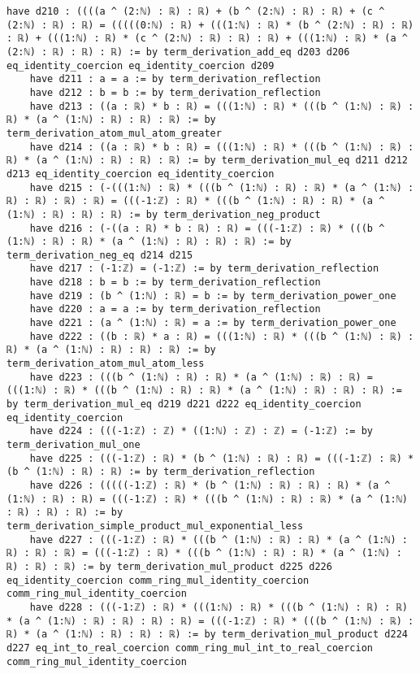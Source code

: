 \documentclass{article}
\begin{document}
\begin{tcolorbox}[colback=white!10, width=\linewidth]
\begin{lstlisting}[language=Lean4]
    have d210 : ((((a ^ (2:ℕ) : ℝ) : ℝ) + (b ^ (2:ℕ) : ℝ) : ℝ) + (c ^ (2:ℕ) : ℝ) : ℝ) = (((((0:ℕ) : ℝ) + (((1:ℕ) : ℝ) * (b ^ (2:ℕ) : ℝ) : ℝ) : ℝ) + (((1:ℕ) : ℝ) * (c ^ (2:ℕ) : ℝ) : ℝ) : ℝ) + (((1:ℕ) : ℝ) * (a ^ (2:ℕ) : ℝ) : ℝ) : ℝ) := by term_derivation_add_eq d203 d206 eq_identity_coercion eq_identity_coercion d209
    have d211 : a = a := by term_derivation_reflection
    have d212 : b = b := by term_derivation_reflection
    have d213 : ((a : ℝ) * b : ℝ) = (((1:ℕ) : ℝ) * (((b ^ (1:ℕ) : ℝ) : ℝ) * (a ^ (1:ℕ) : ℝ) : ℝ) : ℝ) := by term_derivation_atom_mul_atom_greater
    have d214 : ((a : ℝ) * b : ℝ) = (((1:ℕ) : ℝ) * (((b ^ (1:ℕ) : ℝ) : ℝ) * (a ^ (1:ℕ) : ℝ) : ℝ) : ℝ) := by term_derivation_mul_eq d211 d212 d213 eq_identity_coercion eq_identity_coercion
    have d215 : (-(((1:ℕ) : ℝ) * (((b ^ (1:ℕ) : ℝ) : ℝ) * (a ^ (1:ℕ) : ℝ) : ℝ) : ℝ) : ℝ) = (((-1:ℤ) : ℝ) * (((b ^ (1:ℕ) : ℝ) : ℝ) * (a ^ (1:ℕ) : ℝ) : ℝ) : ℝ) := by term_derivation_neg_product
    have d216 : (-((a : ℝ) * b : ℝ) : ℝ) = (((-1:ℤ) : ℝ) * (((b ^ (1:ℕ) : ℝ) : ℝ) * (a ^ (1:ℕ) : ℝ) : ℝ) : ℝ) := by term_derivation_neg_eq d214 d215
    have d217 : (-1:ℤ) = (-1:ℤ) := by term_derivation_reflection
    have d218 : b = b := by term_derivation_reflection
    have d219 : (b ^ (1:ℕ) : ℝ) = b := by term_derivation_power_one
    have d220 : a = a := by term_derivation_reflection
    have d221 : (a ^ (1:ℕ) : ℝ) = a := by term_derivation_power_one
    have d222 : ((b : ℝ) * a : ℝ) = (((1:ℕ) : ℝ) * (((b ^ (1:ℕ) : ℝ) : ℝ) * (a ^ (1:ℕ) : ℝ) : ℝ) : ℝ) := by term_derivation_atom_mul_atom_less
    have d223 : (((b ^ (1:ℕ) : ℝ) : ℝ) * (a ^ (1:ℕ) : ℝ) : ℝ) = (((1:ℕ) : ℝ) * (((b ^ (1:ℕ) : ℝ) : ℝ) * (a ^ (1:ℕ) : ℝ) : ℝ) : ℝ) := by term_derivation_mul_eq d219 d221 d222 eq_identity_coercion eq_identity_coercion
    have d224 : (((-1:ℤ) : ℤ) * ((1:ℕ) : ℤ) : ℤ) = (-1:ℤ) := by term_derivation_mul_one
    have d225 : (((-1:ℤ) : ℝ) * (b ^ (1:ℕ) : ℝ) : ℝ) = (((-1:ℤ) : ℝ) * (b ^ (1:ℕ) : ℝ) : ℝ) := by term_derivation_reflection
    have d226 : (((((-1:ℤ) : ℝ) * (b ^ (1:ℕ) : ℝ) : ℝ) : ℝ) * (a ^ (1:ℕ) : ℝ) : ℝ) = (((-1:ℤ) : ℝ) * (((b ^ (1:ℕ) : ℝ) : ℝ) * (a ^ (1:ℕ) : ℝ) : ℝ) : ℝ) := by term_derivation_simple_product_mul_exponential_less
    have d227 : (((-1:ℤ) : ℝ) * (((b ^ (1:ℕ) : ℝ) : ℝ) * (a ^ (1:ℕ) : ℝ) : ℝ) : ℝ) = (((-1:ℤ) : ℝ) * (((b ^ (1:ℕ) : ℝ) : ℝ) * (a ^ (1:ℕ) : ℝ) : ℝ) : ℝ) := by term_derivation_mul_product d225 d226 eq_identity_coercion comm_ring_mul_identity_coercion comm_ring_mul_identity_coercion
    have d228 : (((-1:ℤ) : ℝ) * (((1:ℕ) : ℝ) * (((b ^ (1:ℕ) : ℝ) : ℝ) * (a ^ (1:ℕ) : ℝ) : ℝ) : ℝ) : ℝ) = (((-1:ℤ) : ℝ) * (((b ^ (1:ℕ) : ℝ) : ℝ) * (a ^ (1:ℕ) : ℝ) : ℝ) : ℝ) := by term_derivation_mul_product d224 d227 eq_int_to_real_coercion comm_ring_mul_int_to_real_coercion comm_ring_mul_identity_coercion

\end{lstlisting}
\end{tcolorbox}
\end{document}
